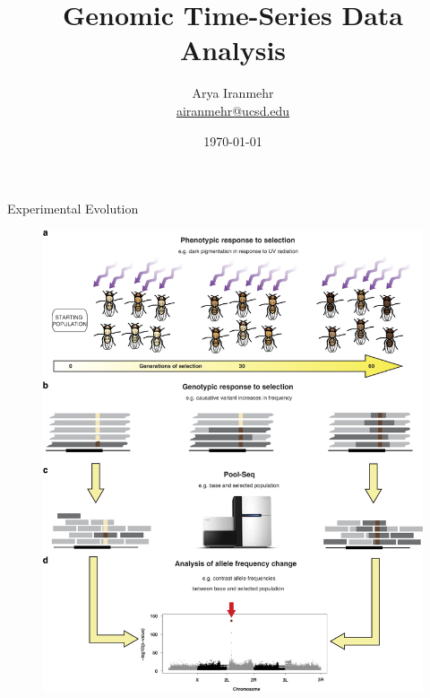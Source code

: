 \documentclass[t]{beamer} %
\title{Genomic Time-Series Data Analysis}
\subtitle{}
\author[Arya Iranmehr]
{%
  \texorpdfstring{
      \centering
      Arya Iranmehr\\
      \href{mailto:airanmehr@ucsd.edu}{airanmehr@ucsd.edu}
  }
  {Arya Iranmehr}
}
\institute{
Bafna Lab\\
University of California, San Diego}
\date{
\monthyeardate\today}
\begin{document}
\begin{frame}
  \titlepage
\end{frame}




\begin{frame}
Experimental Evolution
\begin{figure}
\includegraphics[trim={0 2.1in 0 0},clip, scale=0.6]{eg.jpg} 
\end{figure}
\end{frame}
\end{document}
